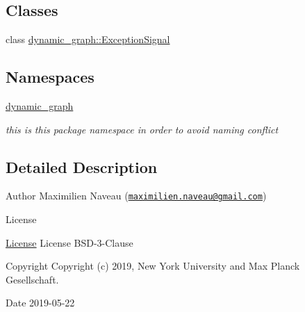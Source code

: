 \subsection*{Classes}
\begin{DoxyCompactItemize}
\item 
class \hyperlink{classdynamic__graph_1_1ExceptionSignal}{dynamic\+\_\+graph\+::\+Exception\+Signal}
\end{DoxyCompactItemize}
\subsection*{Namespaces}
\begin{DoxyCompactItemize}
\item 
 \hyperlink{namespacedynamic__graph}{dynamic\+\_\+graph}
\begin{DoxyCompactList}\small\item\em this is this package namespace in order to avoid naming conflict \end{DoxyCompactList}\end{DoxyCompactItemize}


\subsection{Detailed Description}
\begin{DoxyAuthor}{Author}
Maximilien Naveau (\href{mailto:maximilien.naveau@gmail.com}{\tt maximilien.\+naveau@gmail.\+com}) 
\end{DoxyAuthor}
\begin{DoxyRefDesc}{License}
\item[\hyperlink{license__license000010}{License}]License B\+S\+D-\/3-\/\+Clause \end{DoxyRefDesc}
\begin{DoxyCopyright}{Copyright}
Copyright (c) 2019, New York University and Max Planck Gesellschaft. 
\end{DoxyCopyright}
\begin{DoxyDate}{Date}
2019-\/05-\/22 
\end{DoxyDate}
